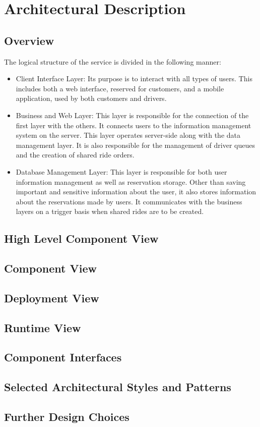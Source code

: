 \section{Architectural Description}

\subsection{Overview}
	The logical structure of the service is divided in the following manner:
	\begin{itemize}
		\item{Client Interface Layer:} Its purpose is to interact with all types of users. This includes both a web interface, reserved for customers, and a mobile application,
			used by both customers and drivers.
		\item{Business and Web Layer:} This layer is responsible for the connection of the first layer with the others. It connects users to the information management
			system on the server. This layer operates server-side along with the data management layer. It is also responsible for the management of driver queues and 
			the creation of shared ride orders. 
		\item{Database Management Layer:} This layer is responsible for both user information management as well as reservation storage. Other than saving important and sensitive
			information about the user, it also stores information about the reservations made by users. It communicates with the business layers on a trigger basis when shared rides
			are to be created.
	\end{itemize}
\subsection{High Level Component View}

\subsection{Component View}

\subsection{Deployment View}

\subsection{Runtime View}

\subsection{Component Interfaces}

\subsection{Selected Architectural Styles and Patterns}

\subsection{Further Design Choices}

